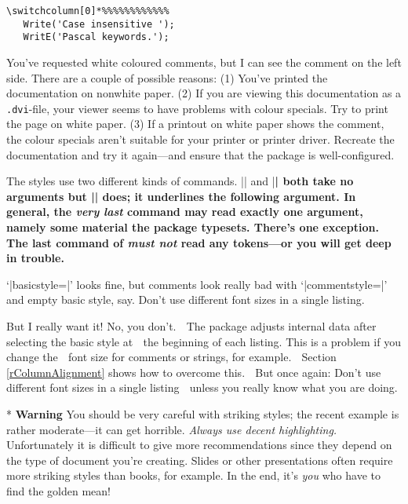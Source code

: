 \begin{paracol}{2}
\begin{lstsample}{}{}
\begin{lstlisting}
\switchcolumn[0]*%%%%%%%%%%%%
   Write('Case insensitive ');
   WritE('Pascal keywords.');
   \end{lstlisting}
\end{lstsample}
\ifcolor
\begin{advise}
\item You've requested white coloured comments, but I can see the comment
      on the left side.
      \advisespace
      There are a couple of possible reasons:
      (1) You've printed the documentation on nonwhite paper.
      (2) If you are viewing this documentation as a \texttt{.dvi}-file, your
          viewer seems to have problems with colour specials. Try to print
          the page on white paper.
      (3) If a printout on white paper shows the comment, the colour
          specials aren't suitable for your printer or printer driver.
          Recreate the documentation and try it again---and ensure that
          the  package is well-configured.
\end{advise}
\fi
The styles use two different kinds of commands. |\ttfamily| and |\bfseries|
both take no arguments but |\underbar| does; it underlines the following
argument. In general, the \emph{very last} command may read exactly one
argument, namely some material the package typesets. There's one exception.
The last command of  \emph{must not} read any
tokens---or you will get deep in trouble.
\begin{advise}
\item `|basicstyle=\small|' looks fine, but comments look really bad with
      `|commentstyle=\tiny|' and empty basic style, say.
      \advisespace
      Don't use different font sizes in a single listing.
\item But I really want it!
      \advisespace
      No, you don't.
^^A       The package adjusts internal data after selecting the basic style at
^^A       the beginning of each listing. This is a problem if you change the
^^A       font size for comments or strings, for example.
^^A       Section \ref{rColumnAlignment} shows how to overcome this.
^^A       But once again: Don't use different font sizes in a single listing
^^A       unless you really know what you are doing.
\end{advise}
\switchcolumn

\switchcolumn[0]*%
\textbf{Warning}\label{wStrikingStyles}
You should be very careful with striking styles; the recent example is rather
moderate---it can get horrible. \emph{Always use decent highlighting.}
Unfortunately it is difficult to give more recommendations since they depend
on the type of document you're creating. Slides or other presentations often
require more striking styles than books, for example.
In the end, it's \emph{you} who have to find the golden mean!
\switchcolumn


\end{paracol}
